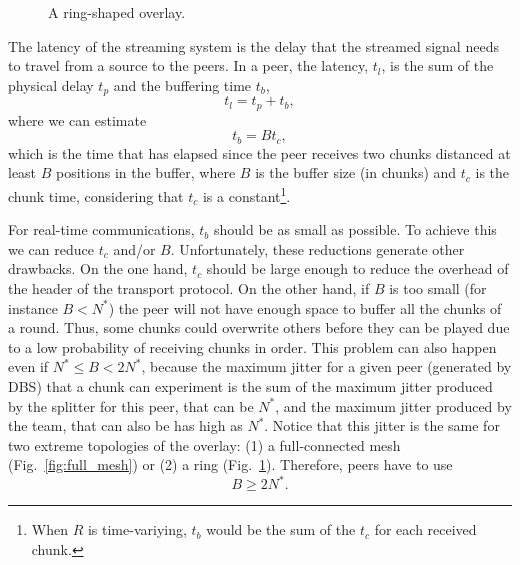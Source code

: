 

\label{sec:latency}

\begin{figure}
  \centering
  \vbox{}
  \caption{A ring-shaped overlay.}
  \label{fig:ring}
\end{figure}

The latency of the streaming system is the delay that the streamed
signal needs to travel from a source to the peers. In a peer, the
latency, $t_l$, is the sum of the physical delay $t_p$ and the
buffering time $t_b$,
\begin{equation}
  \label{eq:t_l}
  t_l = t_p + t_b,
\end{equation}
where we can estimate
\begin{equation}
  \label{eq:t_b}
  t_b = Bt_c,
\end{equation}
which is the time that has elapsed since the peer receives two chunks
distanced at least $B$ positions in the buffer, where $B$ is the
buffer size (in chunks) and $t_c$ is the chunk time, considering that
$t_c$ is a constant\footnote{When $R$ is time-variying, $t_b$ would be
  the sum of the $t_c$ for each received chunk.}.

For real-time communications, $t_b$ should be as small as possible. To
achieve this we can reduce $t_c$ and/or $B$. Unfortunately, these
reductions generate other drawbacks. On the one hand, $t_c$ should be
large enough to reduce the overhead of the header of the transport
protocol. On the other hand, if $B$ is too small (for instance
$B<N^*$) the peer will not have enough space to buffer all the chunks
of a round. Thus, some chunks could overwrite others before they can
be played due to a low probability of receiving chunks in order. This
problem can also happen even if $N^*\leq B<2N^*$, because the maximum
jitter for a given peer (generated by DBS) that a chunk can experiment
is the sum of the maximum jitter produced by the splitter for this
peer, that can be $N^*$, and the maximum jitter produced by the team,
that can also be has high as $N^*$. Notice that this jitter is the
same for two extreme topologies of the overlay: (1) a full-connected
mesh (Fig.~\ref{fig:full_mesh}) or (2) a ring
(Fig.~\ref{fig:ring}). Therefore, peers have to use
\begin{equation}
  \label{eq:minimum_B}
  B\ge 2N^*.
\end{equation}

